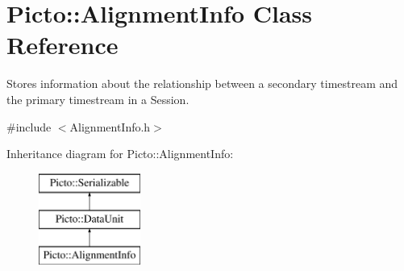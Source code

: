 \hypertarget{class_picto_1_1_alignment_info}{\section{Picto\-:\-:Alignment\-Info Class Reference}
\label{class_picto_1_1_alignment_info}
}


Stores information about the relationship between a secondary timestream and the primary timestream in a Session.  




{\ttfamily \#include $<$Alignment\-Info.\-h$>$}

Inheritance diagram for Picto\-:\-:Alignment\-Info\-:\begin{figure}[H]
\begin{center}
\leavevmode
\includegraphics[height=3.000000cm]{class_picto_1_1_alignment_info}
\end{center}
\end{figure}
